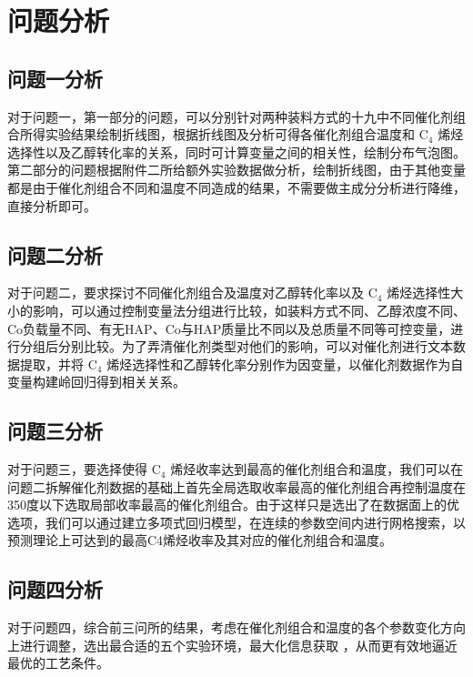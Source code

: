 \newpage
\section{问题分析}
\subsection{问题一分析}
对于问题一，第一部分的问题，可以分别针对两种装料方式的十九中不同催化剂组合所得实验结果绘制折线图，根据折线图及分析可得各催化剂组合温度和 \( \text{C}_4 \) 烯烃选择性以及乙醇转化率的关系，同时可计算变量之间的相关性，绘制分布气泡图。第二部分的问题根据附件二所给额外实验数据做分析，绘制折线图，由于其他变量都是由于催化剂组合不同和温度不同造成的结果，不需要做主成分分析进行降维，直接分析即可。



\subsection{问题二分析} 
对于问题二，要求探讨不同催化剂组合及温度对乙醇转化率以及 \( \text{C}_4 \) 烯烃选择性大小的影响，可以通过控制变量法分组进行比较，如装料方式不同、乙醇浓度不同、Co负载量不同、有无HAP、Co与HAP质量比不同以及总质量不同等可控变量，进行分组后分别比较。为了弄清催化剂类型对他们的影响，可以对催化剂进行文本数据提取，并将 \( \text{C}_4 \) 烯烃选择性和乙醇转化率分别作为因变量，以催化剂数据作为自变量构建岭回归得到相关关系。



\subsection{问题三分析}
对于问题三，要选择使得 \( \text{C}_4 \) 烯烃收率达到最高的催化剂组合和温度，我们可以在问题二拆解催化剂数据的基础上首先全局选取收率最高的催化剂组合再控制温度在350度以下选取局部收率最高的催化剂组合。由于这样只是选出了在数据面上的优选项，我们可以通过建立多项式回归模型，在连续的参数空间内进行网格搜索，以预测理论上可达到的最高C4烯烃收率及其对应的催化剂组合和温度。




\subsection{问题四分析}
对于问题四，综合前三问所的结果，考虑在催化剂组合和温度的各个参数变化方向上进行调整，选出最合适的五个实验环境，最大化信息获取 ，从而更有效地逼近最优的工艺条件。


